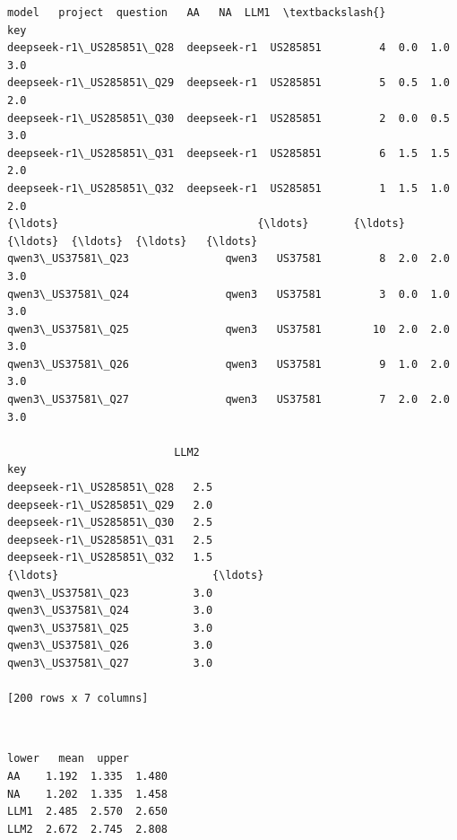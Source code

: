 \documentclass[11pt]{article}
\makeatletter
\newcommand{\boxspacing}{\kern\kvtcb@left@rule\kern\kvtcb@boxsep}
\newcommand{\prompt}[4]{
        {\ttfamily\llap{{\color{#2}[#3]:\hspace{3pt}#4}}\vspace{-\baselineskip}}
    }
\makeatother
\begin{document}
            \begin{tcolorbox}[breakable, size=fbox, boxrule=.5pt, pad at break*=1mm, opacityfill=0]
\prompt{Out}{outcolor}{51}{\boxspacing}
\begin{Verbatim}[commandchars=\\\{\}]
                                model   project  question   AA   NA  LLM1  \textbackslash{}
key
deepseek-r1\_US285851\_Q28  deepseek-r1  US285851         4  0.0  1.0   3.0
deepseek-r1\_US285851\_Q29  deepseek-r1  US285851         5  0.5  1.0   2.0
deepseek-r1\_US285851\_Q30  deepseek-r1  US285851         2  0.0  0.5   3.0
deepseek-r1\_US285851\_Q31  deepseek-r1  US285851         6  1.5  1.5   2.0
deepseek-r1\_US285851\_Q32  deepseek-r1  US285851         1  1.5  1.0   2.0
{\ldots}                               {\ldots}       {\ldots}       {\ldots}  {\ldots}  {\ldots}   {\ldots}
qwen3\_US37581\_Q23               qwen3   US37581         8  2.0  2.0   3.0
qwen3\_US37581\_Q24               qwen3   US37581         3  0.0  1.0   3.0
qwen3\_US37581\_Q25               qwen3   US37581        10  2.0  2.0   3.0
qwen3\_US37581\_Q26               qwen3   US37581         9  1.0  2.0   3.0
qwen3\_US37581\_Q27               qwen3   US37581         7  2.0  2.0   3.0

                          LLM2
key
deepseek-r1\_US285851\_Q28   2.5
deepseek-r1\_US285851\_Q29   2.0
deepseek-r1\_US285851\_Q30   2.5
deepseek-r1\_US285851\_Q31   2.5
deepseek-r1\_US285851\_Q32   1.5
{\ldots}                        {\ldots}
qwen3\_US37581\_Q23          3.0
qwen3\_US37581\_Q24          3.0
qwen3\_US37581\_Q25          3.0
qwen3\_US37581\_Q26          3.0
qwen3\_US37581\_Q27          3.0

[200 rows x 7 columns]
\end{Verbatim}
\end{tcolorbox}
        
    \begin{center}
    \end{center}
    { \hspace*{\fill} \\}
    
            \begin{tcolorbox}[breakable, size=fbox, boxrule=.5pt, pad at break*=1mm, opacityfill=0]
\prompt{Out}{outcolor}{54}{\boxspacing}
\begin{Verbatim}[commandchars=\\\{\}]
      lower   mean  upper
AA    1.192  1.335  1.480
NA    1.202  1.335  1.458
LLM1  2.485  2.570  2.650
LLM2  2.672  2.745  2.808
\end{Verbatim}
\end{tcolorbox}
        
\end{document}
